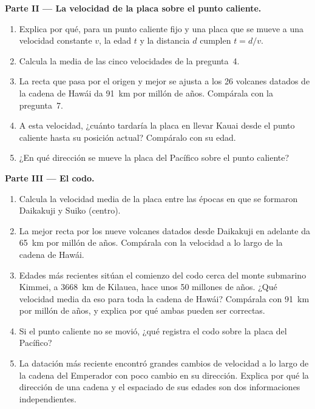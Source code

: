 \begin{problem}
\medskip
\noindent\textbf{Parte II --- La velocidad de la placa sobre el punto caliente.}
\begin{enumerate}[resume]
  \item Explica por qué, para un punto caliente fijo y una placa que se mueve
        a una velocidad constante $v$, la edad $t$ y la distancia $d$ cumplen $t = d/v$.
  \item Calcula la media de las cinco velocidades de la pregunta~4.
  \item La recta que pasa por el origen y mejor se ajusta a los 26 volcanes
        datados de la cadena de Hawái da \qty{91}{km} por millón de años.
        Compárala con la pregunta~7.
  \item A esta velocidad, ¿cuánto tardaría la placa en llevar Kauai desde el
        punto caliente hasta su posición actual? Compáralo con su edad.
  \item ¿En qué dirección se mueve la placa del Pacífico sobre el punto caliente?
\end{enumerate}

\medskip
\noindent\textbf{Parte III --- El codo.}
\begin{enumerate}[resume]
  \item Calcula la velocidad media de la placa entre las épocas en que se
        formaron Daikakuji y Suiko (centro).
  \item La mejor recta por los nueve volcanes datados desde Daikakuji en
        adelante da \qty{65}{km} por millón de años. Compárala con la
        velocidad a lo largo de la cadena de Hawái.
  \item Edades más recientes sitúan el comienzo del codo cerca del monte
        submarino Kimmei, a \qty{3668}{km} de Kilauea, hace unos 50 millones de años.
        ¿Qué velocidad media da eso para toda la cadena de Hawái?
        Compárala con \qty{91}{km} por millón de años, y explica por qué ambas
        pueden ser correctas.
  \item Si el punto caliente no se movió, ¿qué registra el codo sobre la
        placa del Pacífico?
  \item La datación más reciente encontró grandes cambios de velocidad a lo
        largo de la cadena del Emperador con poco cambio en su dirección.
        Explica por qué la dirección de una cadena y el espaciado de sus edades
        son dos informaciones independientes.
\end{enumerate}


\end{problem}
